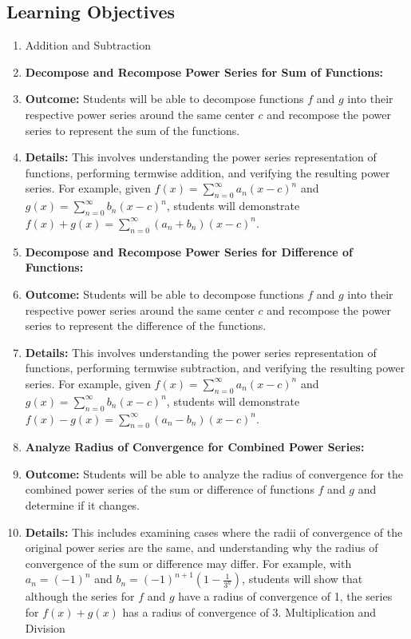 \subsection{Learning Objectives}

\begin{enumerate}
    \item Addition and Subtraction
    \item \textbf{Decompose and Recompose Power Series for Sum of Functions:}
    \item \textbf{Outcome:} Students will be able to decompose functions \( f \) and \( g \) into their respective power series around the same center \( c \) and recompose the power series to represent the sum of the functions.
    \item \textbf{Details:} This involves understanding the power series representation of functions, performing termwise addition, and verifying the resulting power series. For example, given \( f(x) = \sum_{n=0}^\infty a_n (x - c)^n \) and \( g(x) = \sum_{n=0}^\infty b_n (x - c)^n \), students will demonstrate \( f(x) + g(x) = \sum_{n=0}^\infty (a_n + b_n) (x - c)^n \).
    \item \textbf{Decompose and Recompose Power Series for Difference of Functions:}
    \item \textbf{Outcome:} Students will be able to decompose functions \( f \) and \( g \) into their respective power series around the same center \( c \) and recompose the power series to represent the difference of the functions.
    \item \textbf{Details:} This involves understanding the power series representation of functions, performing termwise subtraction, and verifying the resulting power series. For example, given \( f(x) = \sum_{n=0}^\infty a_n (x - c)^n \) and \( g(x) = \sum_{n=0}^\infty b_n (x - c)^n \), students will demonstrate \( f(x) - g(x) = \sum_{n=0}^\infty (a_n - b_n) (x - c)^n \).
    \item \textbf{Analyze Radius of Convergence for Combined Power Series:}
    \item \textbf{Outcome:} Students will be able to analyze the radius of convergence for the combined power series of the sum or difference of functions \( f \) and \( g \) and determine if it changes.
    \item \textbf{Details:} This includes examining cases where the radii of convergence of the original power series are the same, and understanding why the radius of convergence of the sum or difference may differ. For example, with \( a_n = (-1)^n \) and \( b_n = (-1)^{n+1} \left(1 - \frac{1}{3^n}\right) \), students will show that although the series for \( f \) and \( g \) have a radius of convergence of 1, the series for \( f(x) + g(x) \) has a radius of convergence of 3. Multiplication and Division

\end{enumerate}
